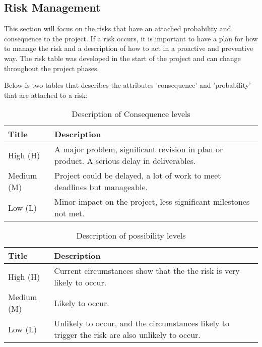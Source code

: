 
\clearpage

\subsection{Risk Management}

This section will focus on the risks that have an attached probability and consequence to the project. If a risk occurs, it is important to have a plan for how to manage the risk and a description of how to act in a proactive and preventive way. The risk table was developed in the start of the project and can change throughout the project phases.

Below is two tables that describes the attributes 'consequence' and 'probability' that are attached to a risk:


\begin{table}[H]
\begin{tabular}{| p{3cm} | p{8cm} |}
  \hline
  \rowcolor{gray}
  {\bf Title} & {\bf Description} \\ \hline
    High (H) & A major problem, significant revision in plan or product. 
    A serious delay in deliverables.\\ \hline
    Medium (M) & Project could be delayed, a lot of work to meet deadlines but
    manageable.\\ \hline
    Low (L) & Minor impact on the project, less significant milestones not met.\\ \hline
\end{tabular}
\caption{Description of Consequence levels}
\end{table}

\begin{table}[H]
\begin{tabular}{| p{3cm} | p{8cm} |}
  \hline
  \rowcolor{gray}
    {\bf Title} & {\bf Description} \\ \hline
    High (H) & Current circumstances show that the the risk is very 
    likely to occur.\\ \hline
    Medium (M) & Likely to occur.\\ \hline
    Low (L) & Unlikely to occur, and the circumstances likely to trigger 
    the risk are also unlikely to occur.\\ \hline
\end{tabular}
\caption{Description of possibility levels}
\end{table}

